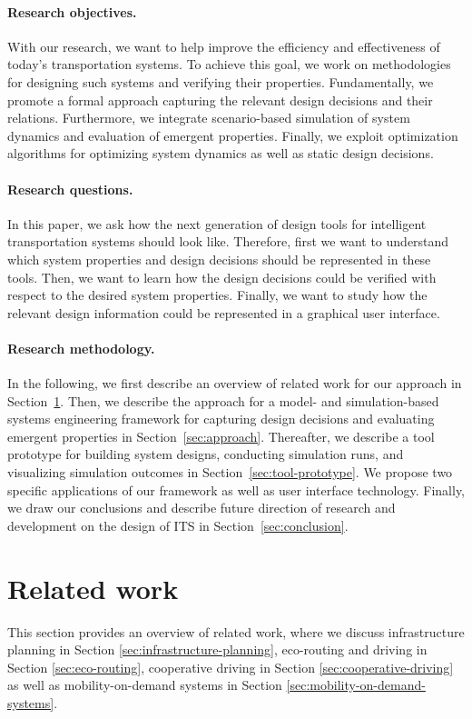 \documentclass[a4paper,twoside]{article}
\begin{document}
	\paragraph{Research objectives.}
	
	With our research, we want to help improve the efficiency and effectiveness of today's transportation systems.
	To achieve this goal, we work on methodologies for designing such systems and verifying their properties.
	Fundamentally, we promote a formal approach capturing the relevant design decisions and their relations.
	Furthermore, we integrate scenario-based simulation of system dynamics and evaluation of emergent properties.
	Finally, we exploit optimization algorithms for optimizing system dynamics as well as static design decisions.
	
	\paragraph{Research questions.}
	
	In this paper, we ask how the next generation of design tools for intelligent transportation systems should look like.
	Therefore, first we want to understand which system properties and design decisions should be represented in these tools.
	Then, we want to learn how the design decisions could be verified with respect to the desired system properties.
	Finally, we want to study how the relevant design information could be represented in a graphical user interface.
	
	\paragraph{Research methodology.}
	
	In the following, we first describe an overview of related work for our approach in Section~\ref{sec:related-work}. Then, we describe the approach for a model- and simulation-based systems engineering framework for capturing design decisions and evaluating emergent properties in Section~\ref{sec:approach}.
	Thereafter, we describe a tool prototype for building system designs, conducting simulation runs, and visualizing simulation outcomes in Section~\ref{sec:tool-prototype}.
	We propose two specific applications of our framework as well as user interface technology.
	Finally, we draw our conclusions and describe future direction of research and development on the design of ITS in Section~\ref{sec:conclusion}. 
	
	\section{Related work}
	\label{sec:related-work}
	This section provides an overview of related work, where we discuss infrastructure planning in Section 	\ref{sec:infrastructure-planning}, eco-routing and driving in Section \ref{sec:eco-routing}, cooperative driving in Section \ref{sec:cooperative-driving} as well as mobility-on-demand systems in Section \ref{sec:mobility-on-demand-systems}.
\end{document}
